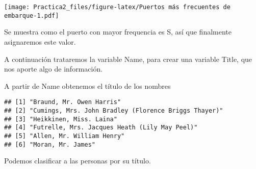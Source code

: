 \documentclass[]{article}
\newenvironment{Shaded}{\begin{snugshade}}{\end{snugshade}}
\newcommand{\KeywordTok}[1]{\textcolor[rgb]{0.13,0.29,0.53}{\textbf{#1}}}
\newcommand{\DecValTok}[1]{\textcolor[rgb]{0.00,0.00,0.81}{#1}}
\newcommand{\CharTok}[1]{\textcolor[rgb]{0.31,0.60,0.02}{#1}}
\newcommand{\StringTok}[1]{\textcolor[rgb]{0.31,0.60,0.02}{#1}}
\newcommand{\CommentTok}[1]{\textcolor[rgb]{0.56,0.35,0.01}{\textit{#1}}}
\newcommand{\OperatorTok}[1]{\textcolor[rgb]{0.81,0.36,0.00}{\textbf{#1}}}
\newcommand{\NormalTok}[1]{#1}
\begin{document}
\texttt{[image: Practica2\_files/figure-latex/Puertos más frecuentes de embarque-1.pdf]}

Se muestra como el puerto con mayor frequencia es S, así que finalmente
asignaremos este valor.

\begin{Shaded}
\end{Shaded}

A continuación trataremos la variable Name, para crear una variable
Title, que nos aporte algo de información.

A partir de Name obtenemos el título de los nombres

\begin{Shaded}
\end{Shaded}

\begin{verbatim}
## [1] "Braund, Mr. Owen Harris"                            
## [2] "Cumings, Mrs. John Bradley (Florence Briggs Thayer)"
## [3] "Heikkinen, Miss. Laina"                             
## [4] "Futrelle, Mrs. Jacques Heath (Lily May Peel)"       
## [5] "Allen, Mr. William Henry"                           
## [6] "Moran, Mr. James"
\end{verbatim}

Podemos clasificar a las personas por su título.

\begin{Shaded}
\end{Shaded}
\end{document}
